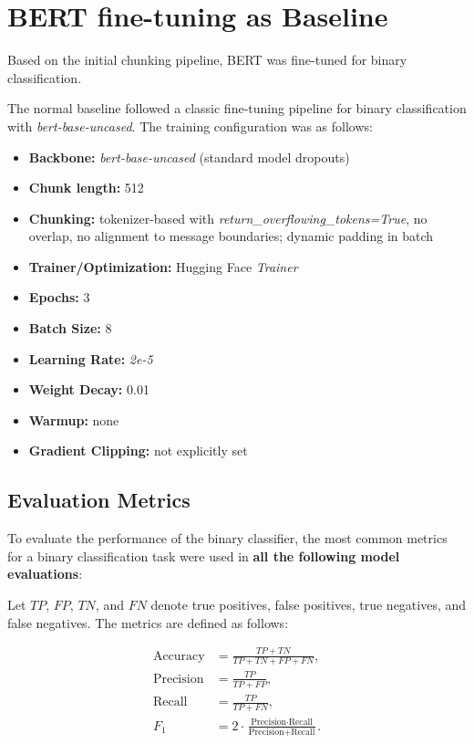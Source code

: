 \section{BERT fine-tuning as Baseline}

Based on the initial chunking pipeline, BERT was fine-tuned for binary classification. 

The normal baseline followed a classic fine-tuning pipeline for binary classification with \textit{bert-base-uncased}. The training configuration was as follows:

\begin{itemize}
  \item \textbf{Backbone:} \textit{bert-base-uncased} (standard model dropouts)
  \item \textbf{Chunk length:} 512
  \item \textbf{Chunking:} tokenizer-based with \textit{return\_overflowing\_tokens=True}, no overlap, no alignment to message boundaries; dynamic padding in batch
  \item \textbf{Trainer/Optimization:} Hugging Face \textit{Trainer}
  \item \textbf{Epochs:} 3
  \item \textbf{Batch Size:} 8 
  \item \textbf{Learning Rate:} \textit{2e-5}
  \item \textbf{Weight Decay:} 0.01
  \item \textbf{Warmup:} none
  \item \textbf{Gradient Clipping:} not explicitly set
\end{itemize}



\subsection{Evaluation Metrics}
To evaluate the performance of the binary classifier, the most common metrics for a binary classification task were used in \textbf{all the following model evaluations}:

Let $TP$, $FP$, $TN$, and $FN$ denote true positives, false positives, true negatives, and false negatives. 
The metrics are defined as follows:

\begin{align}
\text{Accuracy} &= \frac{TP + TN}{TP + TN + FP + FN}, \\
\text{Precision} &= \frac{TP}{TP + FP}, \\
\text{Recall} &= \frac{TP}{TP + FN}, \\
F_{1} &= 2 \cdot \frac{\text{Precision} \cdot \text{Recall}}{\text{Precision} + \text{Recall}}.
\end{align}

